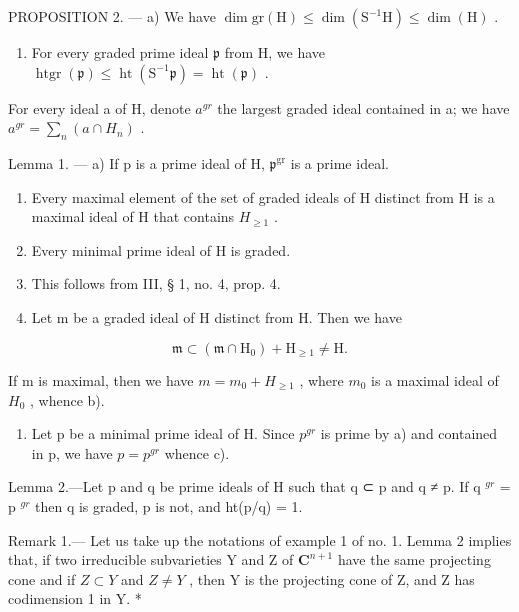 PROPOSITION 2. --- a) We have \(\dim \mathrm{gr}(\mathrm{H}) \leqslant \dim (\mathrm{S}^{-1}\mathrm{H}) \leqslant \dim (\mathrm{H})\) .

\begin{enumerate}
\def\labelenumi{\alph{enumi})}
\setcounter{enumi}{1}
\tightlist
\item
  For every graded prime ideal \(\mathfrak{p}\) from H, we have \(\operatorname{htgr}(\mathfrak{p}) \leqslant \operatorname{ht}(\mathrm{S}^{-1}\mathfrak{p}) = \operatorname{ht}(\mathfrak{p})\) .
\end{enumerate}

For every ideal a of H, denote \(a^{gr}\) the largest graded ideal contained in a; we have \(a^{gr} = \sum_{n} (a \cap H_n)\) .

Lemma 1. --- a) If p is a prime ideal of H, \(\mathfrak{p}^{\mathrm{gr}}\) is a prime ideal.

\begin{enumerate}
\def\labelenumi{\alph{enumi})}
\setcounter{enumi}{1}
\item
  Every maximal element of the set of graded ideals of H distinct from H is a maximal ideal of H that contains \(H_{\geq1}\) .
\item
  Every minimal prime ideal of H is graded.
\item
  This follows from III, § 1, no. 4, prop. 4.
\item
  Let m be a graded ideal of H distinct from H. Then we have
\end{enumerate}

\[
\mathfrak {m} \subset (\mathfrak {m} \cap \mathrm{H} _ {0}) + \mathrm{H} _ {\geqslant 1} \neq \mathrm{H}.
\]

If m is maximal, then we have \(m = m_{0} + H_{\geq 1}\) , where \(m_{0}\) is a maximal ideal of \(H_{0}\) , whence b).

\begin{enumerate}
\def\labelenumi{\alph{enumi})}
\setcounter{enumi}{2}
\tightlist
\item
  Let p be a minimal prime ideal of H. Since \(p^{gr}\) is prime by a) and contained in p, we have \(p = p^{gr}\) whence c).
\end{enumerate}

Lemma 2.---Let p and q be prime ideals of H such that q ⊂ p and q ≠ p. If q \(^{gr}\) = p \(^{gr}\) then q is graded, p is not, and ht(p/q) = 1.

Remark 1.--- Let us take up the notations of example 1 of no. 1. Lemma 2 implies that, if two irreducible subvarieties Y and Z of \(\mathbf{C}^{n+1}\) have the same projecting cone and if \(Z \subset Y\) and \(Z \neq Y\) , then Y is the projecting cone of Z, and Z has codimension 1 in Y. *

